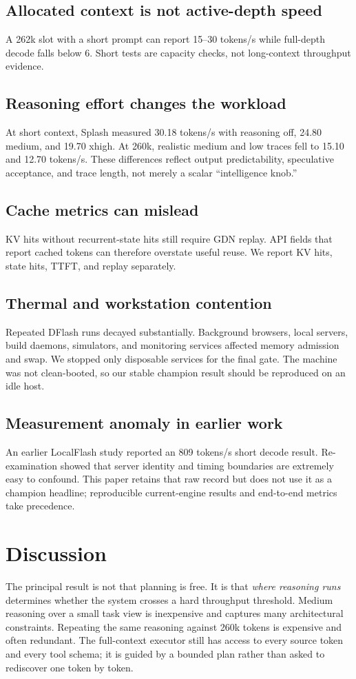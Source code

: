 \documentclass[11pt]{article}
\begin{document}
\subsection{Allocated context is not active-depth speed}
A 262k slot with a short prompt can report 15--30 tokens/s while full-depth decode falls below 6. Short tests are capacity checks, not long-context throughput evidence.

\subsection{Reasoning effort changes the workload}
At short context, Splash measured 30.18 tokens/s with reasoning off, 24.80 medium, and 19.70 xhigh. At 260k, realistic medium and low traces fell to 15.10 and 12.70 tokens/s. These differences reflect output predictability, speculative acceptance, and trace length, not merely a scalar ``intelligence knob.''

\subsection{Cache metrics can mislead}
KV hits without recurrent-state hits still require GDN replay. API fields that report cached tokens can therefore overstate useful reuse. We report KV hits, state hits, TTFT, and replay separately.

\subsection{Thermal and workstation contention}
Repeated DFlash runs decayed substantially. Background browsers, local servers, build daemons, simulators, and monitoring services affected memory admission and swap. We stopped only disposable services for the final gate. The machine was not clean-booted, so our stable champion result should be reproduced on an idle host.

\subsection{Measurement anomaly in earlier work}
An earlier LocalFlash study reported an 809 tokens/s short decode result. Re-examination showed that server identity and timing boundaries are extremely easy to confound. This paper retains that raw record but does not use it as a champion headline; reproducible current-engine results and end-to-end metrics take precedence.

\section{Discussion}
The principal result is not that planning is free. It is that \emph{where reasoning runs} determines whether the system crosses a hard throughput threshold. Medium reasoning over a small task view is inexpensive and captures many architectural constraints. Repeating the same reasoning against 260k tokens is expensive and often redundant. The full-context executor still has access to every source token and every tool schema; it is guided by a bounded plan rather than asked to rediscover one token by token.
\end{document}
